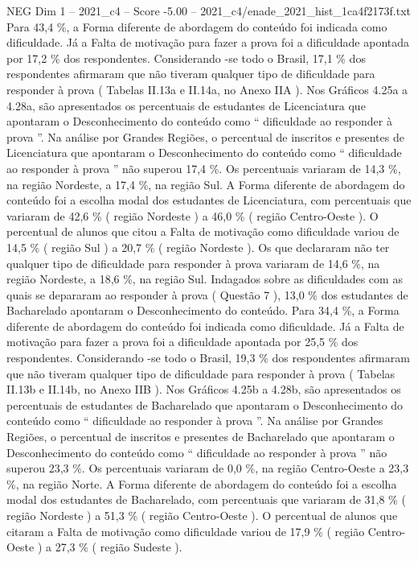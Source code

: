 \begin{textsample}{NEG Dim 1 – 2021\_c4 – Score -5.00 – 2021\_c4/enade\_2021\_hist\_1ca4f2173f.txt}
Para 43,4 \%, a Forma diferente de abordagem do conteúdo foi indicada como dificuldade.
Já a Falta de motivação para fazer a prova foi a dificuldade apontada por 17,2 \% dos respondentes.
Considerando -se todo o Brasil, 17,1 \% dos respondentes afirmaram que não tiveram qualquer tipo de dificuldade para responder à prova ( Tabelas II.13a e II.14a, no Anexo IIA ).
Nos Gráficos 4.25a a 4.28a, são apresentados os percentuais de estudantes de Licenciatura que apontaram o Desconhecimento do conteúdo como “ dificuldade ao responder à prova ”.
Na análise por Grandes Regiões, o percentual de inscritos e presentes de Licenciatura que apontaram o Desconhecimento do conteúdo como “ dificuldade ao responder à prova ” não superou 17,4 \%.
Os percentuais variaram de 14,3 \%, na região Nordeste, a 17,4 \%, na região Sul.
A Forma diferente de abordagem do conteúdo foi a escolha modal dos estudantes de Licenciatura, com percentuais que variaram de 42,6 \% ( região Nordeste ) a 46,0 \% ( região Centro-Oeste ).
O percentual de alunos que citou a Falta de motivação como dificuldade variou de 14,5 \% ( região Sul ) a 20,7 \% ( região Nordeste ).
Os que declararam não ter qualquer tipo de dificuldade para responder à prova variaram de 14,6 \%, na região Nordeste, a 18,6 \%, na região Sul.
Indagados sobre as dificuldades com as quais se depararam ao responder à prova ( Questão 7 ), 13,0 \% dos estudantes de Bacharelado apontaram o Desconhecimento do conteúdo.
Para 34,4 \%, a Forma diferente de abordagem do conteúdo foi indicada como dificuldade.
Já a Falta de motivação para fazer a prova foi a dificuldade apontada por 25,5 \% dos respondentes.
Considerando -se todo o Brasil, 19,3 \% dos respondentes afirmaram que não tiveram qualquer tipo de dificuldade para responder à prova ( Tabelas II.13b e II.14b, no Anexo IIB ).
Nos Gráficos 4.25b a 4.28b, são apresentados os percentuais de estudantes de Bacharelado que apontaram o Desconhecimento do conteúdo como “ dificuldade ao responder à prova ”.
Na análise por Grandes Regiões, o percentual de inscritos e presentes de Bacharelado que apontaram o Desconhecimento do conteúdo como “ dificuldade ao responder à prova ” não superou 23,3 \%.
Os percentuais variaram de 0,0 \%, na região Centro-Oeste a 23,3 \%, na região Norte.
A Forma diferente de abordagem do conteúdo foi a escolha modal dos estudantes de Bacharelado, com percentuais que variaram de 31,8 \% ( região Nordeste ) a 51,3 \% ( região Centro-Oeste ).
O percentual de alunos que citaram a Falta de motivação como dificuldade variou de 17,9 \% ( região Centro-Oeste ) a 27,3 \% ( região Sudeste ).

\end{textsample}
